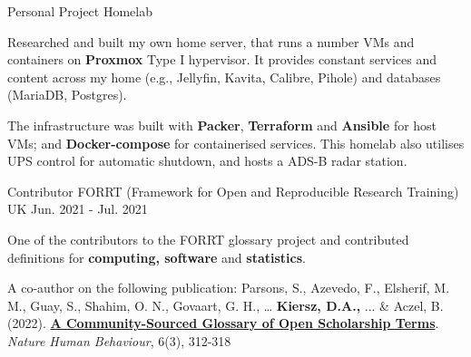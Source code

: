 \begin{cventries}
   	

  \cventry
   	{Personal Project}
    {Homelab}
    {} %
    {} %
    {
     \begin{cvitems} 
     	\item Researched and built my own home server, that runs a number VMs and containers on \textbf{Proxmox} Type I hypervisor. It provides constant services and content across my home (e.g., Jellyfin, Kavita, Calibre, Pihole) and databases (MariaDB, Postgres). 
     	\item The infrastructure was built with \textbf{Packer}, \textbf{Terraform} and \textbf{Ansible} for host VMs; and \textbf{Docker-compose} for containerised services. This homelab also utilises UPS control for automatic shutdown, and hosts a ADS-B radar station.
     \end{cvitems}
     }
     


  \cventry
    {Contributor} %
    {FORRT (Framework for Open and Reproducible Research Training)} %
    {UK} %
    {Jun. 2021 - Jul. 2021} %
    {
      \begin{cvitems} %
		\item One of the contributors to the FORRT glossary project and contributed definitions for \textbf{computing, software} and \textbf{statistics}. 
		\item A co-author on the following publication: Parsons, S., Azevedo, F., Elsherif, M. M., Guay, S., Shahim, O. N., Govaart, G. H., … \textbf{Kiersz, D.A.,} ... \& Aczel, B. (2022). \textbf{\href{https://www.nature.com/articles/s41562-021-01269-4}{A Community-Sourced Glossary of Open Scholarship Terms}}. \textit{Nature Human Behaviour}, 6(3), 312-318
      \end{cvitems}
    }


\end{cventries}
